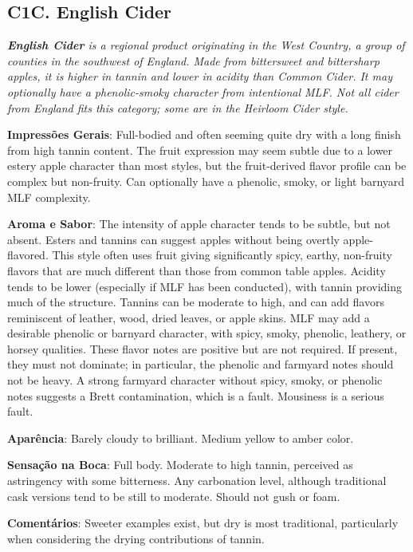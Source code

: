 \subsection*{C1C. English Cider}

\textit{\textbf{English Cider} is a regional product originating in the West Country, a group of counties in the southwest of England. Made from bittersweet and bittersharp apples, it is higher in tannin and lower in acidity than Common Cider. It may optionally have a phenolic-smoky character from intentional MLF. Not all cider from England fits this category; some are in the Heirloom Cider style.}

\textbf{Impressões Gerais}: Full-bodied and often seeming quite dry with a long finish from high tannin content. The fruit expression may seem subtle due to a lower estery apple character than most styles, but the fruit-derived flavor profile can be complex but non-fruity. Can optionally have a phenolic, smoky, or light barnyard MLF complexity.

\textbf{Aroma e Sabor}: The intensity of apple character tends to be subtle, but not absent. Esters and tannins can suggest apples without being overtly apple-flavored. This style often uses fruit giving significantly spicy, earthy, non-fruity flavors that are much different than those from common table apples. Acidity tends to be lower (especially if MLF has been conducted), with tannin providing much of the structure. Tannins can be moderate to high, and can add flavors reminiscent of leather, wood, dried leaves, or apple skins. MLF may add a desirable phenolic or barnyard character, with spicy, smoky, phenolic, leathery, or horsey qualities. These flavor notes are positive but are not required. If present, they must not dominate; in particular, the phenolic and farmyard notes should not be heavy. A strong farmyard character without spicy, smoky, or phenolic notes suggests a Brett contamination, which is a fault. Mousiness is a serious fault.

\textbf{Aparência}: Barely cloudy to brilliant. Medium yellow to amber color.

\textbf{Sensação na Boca}: Full body. Moderate to high tannin, perceived as astringency with some bitterness. Any carbonation level, although traditional cask versions tend to be still to moderate. Should not gush or foam.

\textbf{Comentários}: Sweeter examples exist, but dry is most traditional, particularly when considering the drying contributions of tannin.

